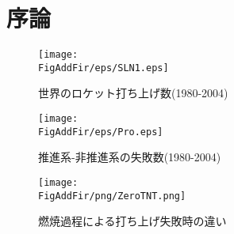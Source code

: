 \chapter{序論}
\newcommand{\FigAddFir}{./src/Chapter1/Figure}




\begin{figure}
\centering
\texttt{[image: \\FigAddFir/eps/SLN1.eps]}
\caption{世界のロケット打ち上げ数(1980-2004)}
\label{fig:Success/Failure}
\end{figure}
\begin{figure}
\centering
\texttt{[image: \\FigAddFir/eps/Pro.eps]}
\caption{推進系-非推進系の失敗数(1980-2004)}
\label{fig:ProFail}
\end{figure}
\begin{figure}
\centering
\texttt{[image: \\FigAddFir/png/ZeroTNT.png]}
\caption{燃焼過程による打ち上げ失敗時の違い}
\label{fig:DiffExplo}
\end{figure}
